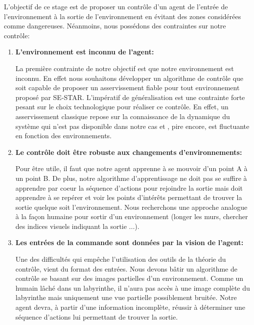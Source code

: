 L'objectif de ce stage est de proposer un contrôle d'un agent de l'entrée de l'environnement à la sortie de l'environnement en évitant des zones considérées comme dangereuses. Néanmoins, nous possédons des contraintes sur notre contrôle:     

\begin{enumerate}
    \item \textbf{L'environnement est inconnu de l'agent:}
    \smallskip
    
    La première contrainte de notre objectif est que notre environnement est inconnu. En effet nous souhaitons développer un algorithme de contrôle que soit capable de proposer un asservissement fiable pour tout environnement proposé par SE-STAR. L'impératif de généralisation est une contrainte forte pesant sur le choix technologique pour réaliser ce contrôle. En effet, un asservissement classique repose sur la connaissance de la dynamique du système qui n'est pas disponible dans notre cas et , pire encore, est fluctuante en fonction des environnements.
    
    \item \textbf{Le contrôle doit être robuste aux changements d'environnements:}
    \smallskip
    
    Pour être utile, il faut que notre agent apprenne à se mouvoir d'un point A à un point B. De plus, notre algorithme d'apprentissage ne doit pas se suffire à apprendre par coeur la séquence d'actions pour rejoindre la sortie mais doit apprendre à se repérer et voir les points d'intérêts permettant de trouver la sortie quelque soit l'environnement. Nous recherchons une approche analogue à la façon humaine  pour sortir d'un environnement (longer les murs, chercher des indices visuels indiquant la sortie ...).
 
    \item \textbf{Les entrées de la commande sont données par la vision de l'agent:}
    \smallskip
    
    Une des difficultés qui empêche l'utilisation des outils de la théorie du contrôle, vient du format des entrées. Nous devons bâtir un algorithme de contrôle se basant sur des images partielles d'un environnement. Comme un humain lâché dans un labyrinthe, il n'aura pas accès à une image complète du labyrinthe mais uniquement une vue partielle possiblement bruitée. Notre agent devra, à partir d'une information incomplète, réussir à déterminer une séquence d'actions lui permettant de trouver la sortie.
    
  
\end{enumerate}

